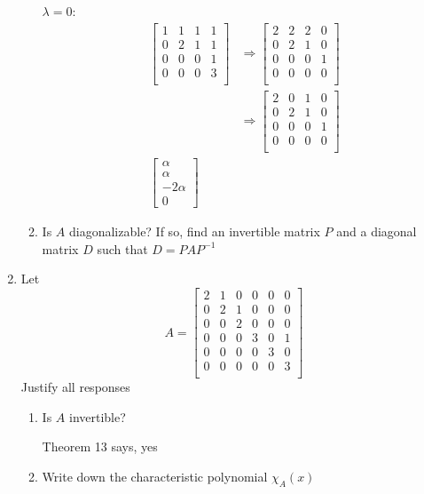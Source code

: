 \documentclass[letterpaper]{article}
\begin{document}
\begin{enumerate}
\begin{enumerate}
  $\lambda=0$:
  \begin{align*}
    \left[\begin{array}{rrrr}
    1&1&1&1\\
    0&2&1&1\\
    0&0&0&1\\
    0&0&0&3\\
    \end{array}\right] 
    &\Rightarrow
    \left[\begin{array}{rrrr}
    2&2&2&0\\
    0&2&1&0\\
    0&0&0&1\\
    0&0&0&0\\
    \end{array}\right]
    \\&\Rightarrow
    \left[\begin{array}{rrrr}
    2&0&1&0\\
    0&2&1&0\\
    0&0&0&1\\
    0&0&0&0\\
    \end{array}\right]\\
    \left[\begin{array}{r}\alpha\\\alpha\\-2\alpha\\0\end{array}\right]
  \end{align*}
  \item
  Is $A$ diagonalizable? If so, find an invertible matrix $P$ and a diagonal matrix $D$ such that $D=PAP^{-1}$
  \end{enumerate}
\item
Let 
\[A=\left[\begin{array}{rrrrrr}
2&1&0&0&0&0\\
0&2&1&0&0&0\\
0&0&2&0&0&0\\
0&0&0&3&0&1\\
0&0&0&0&3&0\\
0&0&0&0&0&3\\
\end{array}\right]\]
Justify all responses
  \begin{enumerate}
  \item
  Is $A$ invertible?

  Theorem 13 says, yes
  \item
  Write down the characteristic polynomial $\chi_A(x)$


\end{enumerate}
\end{enumerate}
\end{document}
